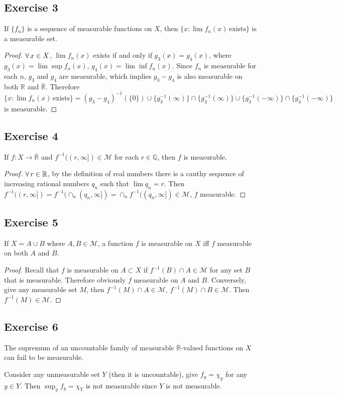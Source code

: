 \subsection*{Exercise 3}
If $\{f_n\}$ is a sequence of measurable functions on $X$, then $\{x:\lim f_n(x)\,\mathrm{exists}\}$ is a measurable set.
\begin{proof}
    $\forall\, x\in X$, $\lim f_n(x)$ exists if and only if $g_3(x)=g_4(x)$, where $g_3(x)=\lim\sup f_n(x)$, $g_4(x)=\lim\inf f_n(x)$. Since $f_n$ is measurable for each $n$, $g_3$ and $g_4$ are measurable, which implies $g_3-g_4$ is also measurable on both $\mathbb{R}$ and $\overline{\mathbb{R}}$. Therefore $\{x:\lim f_n(x)\,\mathrm{exists}\}=(g_3-g_4)^{-1}(\{0\})\cup\{g_3^{-1}(\infty)\}\cap\{g_4^{-1}(\infty)\}\cup\{g_3^{-1}(-\infty)\}\cap\{g_4^{-1}(-\infty)\}$ is measurable.
\end{proof}
\subsection*{Exercise 4}
If $f:X\to\overline{\mathbb{R}}$ and $f^{-1}((r,\infty])\in\mathcal{M}$ for each $r\in\mathbb{Q}$, then $f$ is measurable.
\begin{proof}
    $\forall\, r\in\mathbb{R}$, by the definition of real numbers there is a cauthy sequence of increasing rational numbers $q_n$ such that $\lim q_n=r$. Then $f^{-1}((r,\infty])=f^{-1}(\cap_n(q_n,\infty])=\cap_n f^{-1}((q_n,\infty])\in\mathcal{M}$, $f$ measurable.
\end{proof}
\subsection*{Exercise 5}
If $X=A\cup B$ where $A,B\in\mathcal{M}$, a function $f$ is measurable on $X$ iff $f$ measurable on both $A$ and $B$.
\begin{proof}
    Recall that $f$ is measurable on $A\subset X$ if $f^{-1}(B)\cap A\in\mathcal{M}$ for any set $B$ that is measurable. Therefore obviously $f$ measurable on $A$ and $B$. Conversely, give any measurable set $M$, then $f^{-1}(M)\cap A\in\mathcal{M}$, $f^{-1}(M)\cap B\in\mathcal{M}$. Then $f^{-1}(M)\in\mathcal{M}$.
\end{proof}
\subsection*{Exercise 6}
The supremum of an uncountable family of measurable $\overline{\mathbb{R}}$-valued functions on $X$ can fail to be measurable.
\begin{solution}
    Consider any unmeasurable set $Y$ (then it is uncountable), give $f_y=\chi_y$ for any $y\in Y$. Then $\sup_y f_y=\chi_Y$ is not measurable since $Y$ is not measurable.
\end{solution}
